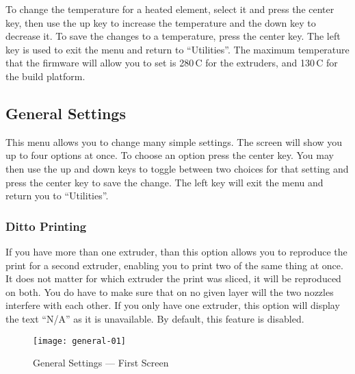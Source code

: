 To change the temperature for a heated element, select it and press the center key, then use the up key to increase the temperature and the down key to decrease it.  To save the changes to a temperature, press the center key.  The left key is used to exit the menu and return to ``Utilities''.  The maximum temperature that the firmware will allow you to set is 280\textdegree\,C for the extruders, and 130\textdegree\,C for the build platform.


\subsection{General Settings} \label{sec:general}

This menu allows you to change many simple settings.  The screen will show you up to four options at once.  To choose an option press the center key.  You may then use the up and down keys to toggle between two choices for that setting and press the center key to save the change.  The left key will exit the menu and return you to ``Utilities''.


\subsubsection{Ditto Printing} \label{sec:ditto}

If you have more than one extruder, than this option allows you to reproduce the print for a second extruder, enabling you to print two of the same thing at once.  It does not matter for which extruder the print was sliced, it will be reproduced on both.  You do have to make sure that on no given layer will the two nozzles interfere with each other.  If you only have one extruder, this option will display the text ``N/A'' as it is unavailable.  By default, this feature is disabled. %

 \begin{figure}[!htbp]
  \centering
    \texttt{[image: general-01]}
    \caption{General Settings --- First Screen}
  \label{fig:genfirst}
\end{figure}


